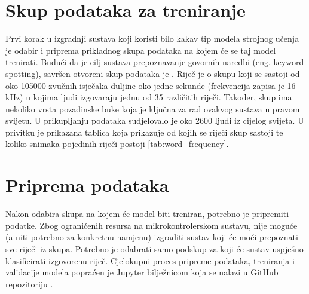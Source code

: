 \section{Skup podataka za treniranje}
\label{sec:dataset}

Prvi korak u izgradnji sustava koji koristi bilo kakav tip modela strojnog učenja
je odabir i priprema prikladnog skupa podataka na kojem će se taj model trenirati.
Budući da je cilj sustava prepoznavanje govornih naredbi (eng. keyword spotting),
savršen otvoreni skup podataka je \cite{speechcommandsv2}. Riječ je o skupu koji
se sastoji od oko 105000 zvučnih isječaka duljine oko jedne sekunde (frekvencija
zapisa je 16 kHz) u kojima ljudi
izgovaraju jednu od 35 različitih riječi. Također, skup ima nekoliko vrsta 
pozadinske buke koja je ključna za rad ovakvog sustava u pravom svijetu. 
U prikupljanju podataka sudjelovalo je oko 2600 ljudi iz cijelog svijeta.
U privitku je prikazana tablica koja prikazuje od kojih se riječi skup sastoji
te koliko snimaka pojedinih riječi postoji \ref{tab:word_frequency}.


\section{Priprema podataka}
\label{sec:data}

Nakon odabira skupa na kojem će model biti treniran, potrebno je pripremiti
podatke. Zbog ograničenih resursa na mikrokontrolerskom sustavu, nije moguće
(a niti potrebno za konkretnu namjenu) izgraditi sustav koji će moći
prepoznati sve riječi iz skupa. Potrebno je odabrati samo podskup
za koji će sustav uspješno klasificirati izgovorenu riječ. Cjelokupni
proces pripreme podataka, treniranja i validacije modela popraćen je
Jupyter bilježnicom koja se nalazi u GitHub repozitoriju
\cite{balic_keyword_spotting}.

